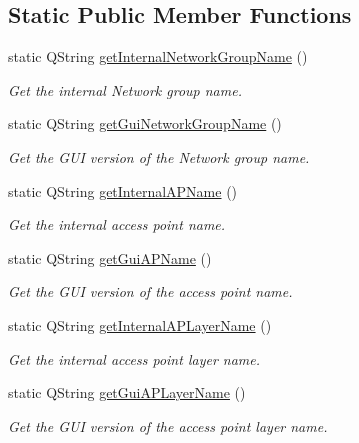\subsection*{Static Public Member Functions}
\begin{DoxyCompactItemize}
\item 
static Q\+String \hyperlink{classV2XFramework_aa0058496403bcc100df86320b1eaa17b}{get\+Internal\+Network\+Group\+Name} ()
\begin{DoxyCompactList}\small\item\em Get the internal Network group name. \end{DoxyCompactList}\item 
static Q\+String \hyperlink{classV2XFramework_a63a8411f6c20f4a4d46faa703004f275}{get\+Gui\+Network\+Group\+Name} ()
\begin{DoxyCompactList}\small\item\em Get the G\+UI version of the Network group name. \end{DoxyCompactList}\item 
static Q\+String \hyperlink{classV2XFramework_a2e96e223ca6d57540284bd38ee50cc0b}{get\+Internal\+A\+P\+Name} ()
\begin{DoxyCompactList}\small\item\em Get the internal access point name. \end{DoxyCompactList}\item 
static Q\+String \hyperlink{classV2XFramework_aeea36d4adc7175a56030dcacabc53d2f}{get\+Gui\+A\+P\+Name} ()
\begin{DoxyCompactList}\small\item\em Get the G\+UI version of the access point name. \end{DoxyCompactList}\item 
static Q\+String \hyperlink{classV2XFramework_a9056b2df054b21522083053ed3d2999b}{get\+Internal\+A\+P\+Layer\+Name} ()
\begin{DoxyCompactList}\small\item\em Get the internal access point layer name. \end{DoxyCompactList}\item 
static Q\+String \hyperlink{classV2XFramework_a77ae415ff10b8fecd1d867a4a9984d01}{get\+Gui\+A\+P\+Layer\+Name} ()
\begin{DoxyCompactList}\small\item\em Get the G\+UI version of the access point layer name. \end{DoxyCompactList}\item 

\end{DoxyCompactItemize}

